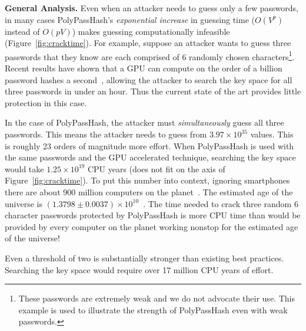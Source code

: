 {\bf General Analysis.}
Even when an attacker needs to guess only a few passwords, in many cases 
PolyPassHash's \emph{exponential increase} in guessing time ($O(V^p)$ instead 
of $O(pV)$) makes guessing computationally infeasible 
(Figure~\ref{fig:cracktime}).   For example, suppose 
an attacker wants to guess three passwords that they know are each comprised 
of 6 randomly chosen characters\footnote{These passwords
are extremely weak and we do not advocate their use.   This 
example is used to illustrate the strength of PolyPassHash even with 
weak passwords.}.  Recent results 
have shown that a GPU can compute on the order of a billion password hashes a 
second~\cite{ElcomSoftGPUCracking, zonenberg2009distributed}, allowing the 
attacker to search the key space for all three passwords in under an hour.
Thus the current state of the art provides little protection in this case.

In the case of PolyPassHash, the attacker must \emph{simultaneously}
guess all three passwords.   This means the attacker needs to guess from 
$3.97 \times {10^{35}}$ values.   This is roughly 23 orders of magnitude more effort.
When PolyPassHash is used with the same passwords and the GPU 
accelerated technique, searching the key space would take $1.25 \times 10^{19}$
CPU years (does not fit on the axis of Figure~\ref{fig:cracktime}).   To put 
this number into context,
ignoring smartphones there are about 900 million computers on the 
planet~\cite{computersexisting}.   The estimated age of the universe is 
$(1.3798 \pm 0.0037) \times 10^{10}$~\cite{universeage}.   The time needed to crack 
three random 6 character passwords protected
by PolyPassHash is more CPU time than would be provided by every computer 
on the planet working nonstop for the estimated age of the universe!

Even a threshold of two is substantially stronger than existing
best practices.   Searching the key space would require over 17 million CPU 
years of effort.


